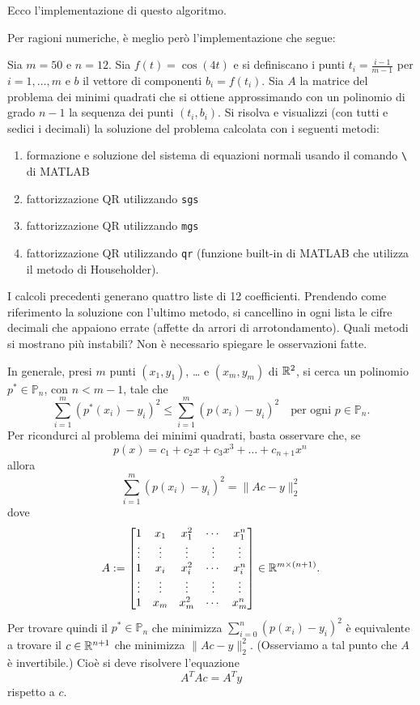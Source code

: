 Ecco l'implementazione di questo algoritmo.



Per ragioni numeriche, è meglio però l'implementazione che segue:




\begin{esercizio}
Sia \(m = 50\) e \(n = 12\). Sia \(f(t) = \cos(4t)\) e si definiscano i punti \(t_i = \frac{i-1}{m-1}\) per \(i = 1, \dots{}, m\) e \(b\) il vettore di componenti \(b_i = f(t_i)\). Sia \(A\) la matrice del problema dei minimi quadrati che si ottiene approssimando con un polinomio di grado \(n-1\) la sequenza dei punti \((t_i, b_i)\). Si risolva e visualizzi (con tutti e sedici i decimali) la soluzione del problema calcolata con i seguenti metodi:
\begin{enumerate}
\item formazione e soluzione del sistema di equazioni normali usando il comando \lstinline£\£ di MATLAB
\item fattorizzazione QR utilizzando \lstinline£sgs£
\item fattorizzazione QR utilizzando \lstinline£mgs£
\item fattorizzazione QR utilizzando \lstinline£qr£ (funzione built-in di MATLAB che utilizza il metodo di Householder).
\end{enumerate}
I calcoli precedenti generano quattro liste di 12 coefficienti. Prendendo come riferimento la soluzione con l'ultimo metodo, si cancellino in ogni lista le cifre decimali che appaiono errate (affette da arrori di arrotondamento). Quali metodi si mostrano più instabili? Non è necessario spiegare le osservazioni fatte.
\end{esercizio}

In generale, presi \(m\) punti \((x_1, y_1)\), \dots{} e \((x_m, y_m)\) di \(\mathbb R^2\), si cerca un polinomio \(p^\ast \in \mathbb P_n\), con \(n < m-1\), tale che
\[\sum_{i = 1}^m (p^\ast(x_i) - y_i)^2 \le \sum_{i = 1}^m (p(x_i) - y_i)^2 \quad \text{per ogni } p \in \mathbb P_n .\]
Per ricondurci al problema dei minimi quadrati, basta osservare che, se
\[p(x) = c_1 + c_2 x + c_3 x^3 + \dots{} + c_{n+1} x^n \,\]
allora
\[\sum_{i = 1}^m (p(x_i) - y_i)^2 = \lVert A c - y \rVert_2^2\]
dove
\[A := \begin{bmatrix}
1 & x_1 & x_1^2 & \cdots{} & x_1^n \\
\vdots{} & \vdots{} & \vdots{} & \vdots{} & \vdots{} \\
1 & x_i & x_i^2 & \cdots{} & x_i^n \\
\vdots{} & \vdots{} & \vdots{} & \vdots{} & \vdots{} \\
1 & x_m & x_m^2 & \cdots{} & x_m^n\end{bmatrix} \in \mathbb R^{m \times (n+1)} .\]
Per trovare quindi il \(p^\ast \in \mathbb P_n\) che minimizza \(\sum_{i = 0}^n (p(x_i) - y_i)^2\) è equivalente a trovare il \(c \in \mathbb R^{n+1}\) che minimizza \(\lVert Ac -y \rVert_2^2\). (Osserviamo a tal punto che \(A\) è invertibile.) Cioè si deve risolvere l'equazione
\[A^T A c = A^T y\]
rispetto a \(c\).

